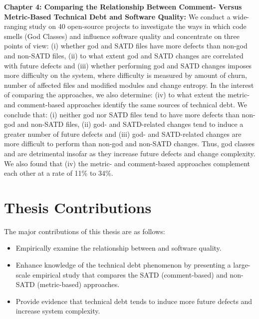 \textbf{Chapter 4: Comparing the Relationship Between Comment- Versus Metric-Based Technical Debt and Software Quality:} We conduct a wide-ranging study on 40 open-source projects to investigate the ways in which code smells (God Classes) and \SATD influence software quality and concentrate on three points of view: (i) whether god and SATD files have more defects than non-god and non-SATD files, (ii) to what extent god and SATD changes are correlated with future defects and (iii) whether performing god and SATD changes imposes more difficulty on the system, where difficulty is measured by amount of churn, number of affected files and modified modules and change entropy. In the interest of comparing the approaches, we also determine: (iv) to what extent the metric- and comment-based approaches identify the same sources of technical debt. We conclude that: (i) neither god nor SATD files tend to have more defects than non-god and non-SATD files, (ii) god- and SATD-related changes tend to induce a greater number of future defects and (iii) god- and SATD-related changes are more difficult to perform than non-god and non-SATD changes. Thus, god classes and \SATD are detrimental insofar as they increase future defects and change complexity. We also found that (iv) the metric- and comment-based approaches complement each other at a rate of 11\% to 34\%.

\section{Thesis Contributions}
The major contributions of this thesis are as follows:
\begin{itemize}
	\item Empirically examine the relationship between \SATD and software quality.
	\item Enhance knowledge of the technical debt phenomenon by presenting a large-scale empirical study that compares the SATD (comment-based) and non-SATD (metric-based) approaches.
	\item Provide evidence that technical debt tends to induce more future defects and increase system complexity.
\end{itemize}